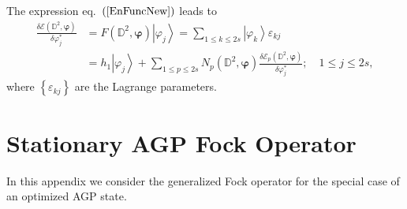 \documentclass[aps,preprint]{revtex4}%
\begin{document}
The expression eq.\ $\left(  \ref{EnFuncNew}\right)  $ leads to
\begin{align}
\frac{\delta\mathcal{E}\left(  \mathbb{D}^{2},\boldsymbol{\varphi}\right)
}{\delta\varphi_{j}^{\ast}}  &  =F\left(  \mathbb{D}^{2},\boldsymbol{\varphi
}\right)  \left\vert \varphi_{j}\right\rangle =\sum_{1\leq k\leq2s}\left\vert
\varphi_{k}\right\rangle \varepsilon_{kj}\nonumber\\
&  =h_{1}\left\vert \varphi_{j}\right\rangle +\sum_{1\leq p\leq2s}N_{p}\left(
\mathbb{D}^{2},\boldsymbol{\varphi}\right)  \frac{\delta\mathcal{E}_{p}\left(
\mathbb{D}^{2},\boldsymbol{\varphi}\right)  }{\delta\varphi_{j}^{\ast}}%
;\quad1\leq j\leq2s,
\end{align}
where $\left\{  \varepsilon_{kj}\right\}  $ are the Lagrange parameters.

\section{Stationary AGP Fock Operator\label{AGPFock}}

In this appendix we consider the generalized Fock operator for the special
case of an optimized AGP state.
\end{document}
